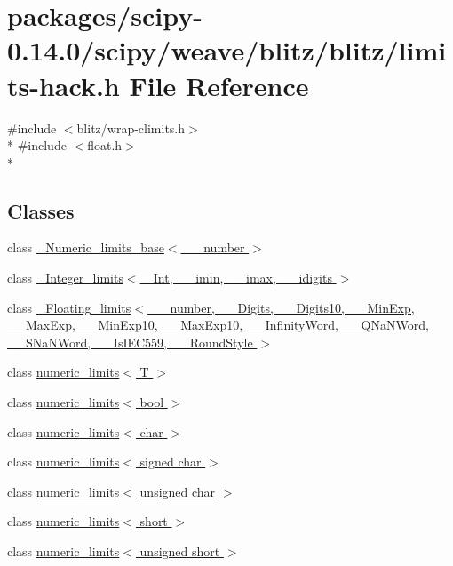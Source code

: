 \hypertarget{limits-hack_8h}{}\section{packages/scipy-\/0.14.0/scipy/weave/blitz/blitz/limits-\/hack.h File Reference}
\label{limits-hack_8h}
{\ttfamily \#include $<$blitz/wrap-\/climits.\+h$>$}\\*
{\ttfamily \#include $<$float.\+h$>$}\\*
\subsection*{Classes}
\begin{DoxyCompactItemize}
\item 
class \hyperlink{class__Numeric__limits__base}{\+\_\+\+Numeric\+\_\+limits\+\_\+base$<$ \+\_\+\+\_\+number $>$}
\item 
class \hyperlink{class__Integer__limits}{\+\_\+\+Integer\+\_\+limits$<$ \+\_\+\+Int, \+\_\+\+\_\+imin, \+\_\+\+\_\+imax, \+\_\+\+\_\+idigits $>$}
\item 
class \hyperlink{class__Floating__limits}{\+\_\+\+Floating\+\_\+limits$<$ \+\_\+\+\_\+number, \+\_\+\+\_\+\+Digits, \+\_\+\+\_\+\+Digits10, \+\_\+\+\_\+\+Min\+Exp, \+\_\+\+\_\+\+Max\+Exp, \+\_\+\+\_\+\+Min\+Exp10, \+\_\+\+\_\+\+Max\+Exp10, \+\_\+\+\_\+\+Infinity\+Word, \+\_\+\+\_\+\+Q\+Na\+N\+Word, \+\_\+\+\_\+\+S\+Na\+N\+Word, \+\_\+\+\_\+\+Is\+I\+E\+C559, \+\_\+\+\_\+\+Round\+Style $>$}
\item 
class \hyperlink{classnumeric__limits}{numeric\+\_\+limits$<$ T $>$}
\item 
class \hyperlink{classnumeric__limits_3_01bool_01_4}{numeric\+\_\+limits$<$ bool $>$}
\item 
class \hyperlink{classnumeric__limits_3_01char_01_4}{numeric\+\_\+limits$<$ char $>$}
\item 
class \hyperlink{classnumeric__limits_3_01signed_01char_01_4}{numeric\+\_\+limits$<$ signed char $>$}
\item 
class \hyperlink{classnumeric__limits_3_01unsigned_01char_01_4}{numeric\+\_\+limits$<$ unsigned char $>$}
\item 
class \hyperlink{classnumeric__limits_3_01short_01_4}{numeric\+\_\+limits$<$ short $>$}
\item 
class \hyperlink{classnumeric__limits_3_01unsigned_01short_01_4}{numeric\+\_\+limits$<$ unsigned short $>$}

\end{DoxyCompactItemize}
